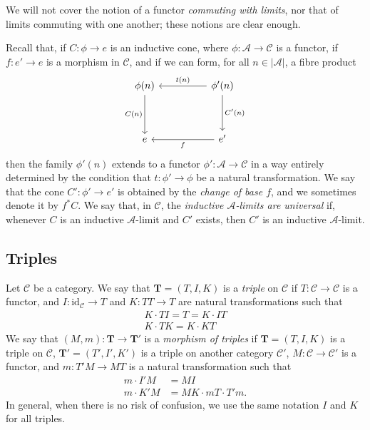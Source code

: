 \documentclass{article}
\newcommand{\oldpage}[1]{\marginpar{\footnotesize$\Big\vert$ \textit{p.~#1}}}
\newcommand{\cat}[1]{\mathcal{#1}}
\newcommand{\set}[1]{|#1|}
\newcommand{\id}{\mathrm{id}}
\newcommand{\TT}{\mathbf{T}}
\begin{document}
We will not cover the notion of a functor \emph{commuting with limits}, nor that of limits commuting with one another;
these notions are clear enough.

Recall that, if $C\colon\phi\to e$ is an inductive cone, where $\phi\colon\cat{A}\to\cat{C}$ is a functor, if $f\colon e'\to e$ is a morphism in $\cat{C}$, and if we can form, for all $n\in\set{\cat{A}}$, a fibre product
\[
  \begin{tikzcd}[sep=huge]
    \phi(n) \ar[d,swap,"C(n)"]
  & \phi'(n) \ar[l,swap,"t(n)"] \ar[d,"C'(n)"]
  \\e
  & e' \ar[l,"f"]
  \end{tikzcd}
\]
then the family $\phi'(n)$ extends to a functor $\phi'\colon\cat{A}\to\cat{C}$ in a way entirely determined by the condition that $t\colon\phi'\to\phi$ be a natural transformation.
We say that the cone $C'\colon\phi'\to e'$ is obtained by the \emph{change of base $f$}, and we sometimes denote it by $f^*C$.
We say that, in $\cat{C}$, the \emph{inductive $\cat{A}$-limits are universal} if, whenever $C$ is an inductive $\cat{A}$-limit and $C'$ exists, then $C'$ is an inductive $\cat{A}$-limit.


\subsection{Triples}

\oldpage{223}
Let $\cat{C}$ be a category.
We say that $\TT=(T,I,K)$ is a \emph{triple} on $\cat{C}$ if $T\colon\cat{C}\to\cat{C}$ is a functor, and $I\colon\id_\cat{C}\to T$ and $K\colon TT\to T$ are natural transformations such that
\[
  \begin{gathered}
    K\cdot TI
    = T
    = K\cdot IT
  \\K\cdot TK
    = K\cdot KT
  \end{gathered}
  \tag{1}
\]
We say that $(M,m)\colon\TT\to\TT'$ is a \emph{morphism of triples} if $\TT=(T,I,K)$ is a triple on $\cat{C}$, $\TT'=(T',I',K')$ is a triple on another category $\cat{C}'$, $M\colon\cat{C}\to\cat{C}'$ is a functor, and $m\colon T'M\to MT$ is a natural transformation such that
\[
  \begin{aligned}
    m\cdot I'M
  & = MI
  \\m\cdot K'M
  & = MK\cdot mT\cdot T'm.
  \end{aligned}
  \tag{2}
\]
In general, when there is no risk of confusion, we use the same notation $I$ and $K$ for all triples.
\end{document}
